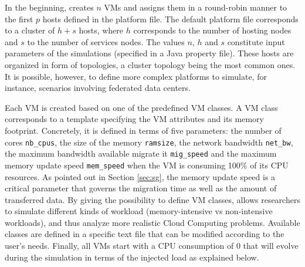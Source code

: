 In the beginning, \vmps creates $n$ VMs and assigns them in a
round-robin manner to the first $p$ hosts defined in the platform
file.  The default platform file corresponds to a cluster of $h+s$
hosts, where $h$ corresponds to the number of hosting nodes and $s$ to
the number of services nodes. The values $n$, $h$ and $s$ constitute
input parameters of the simulations (specified in a Java property
file).
These hosts are organized in form of topologies, a cluster topology
being the most common ones. It is possible, however, to define more
complex platforms to simulate, for instance, scenarios involving
federated data centers.

Each VM is created based on one of the predefined VM classes. A VM
class corresponds to a template specifying the VM attributes and its
memory footprint. Concretely, it is
defined in terms of five parameters: the number of cores
\texttt{nb\_cpus}, the size of the memory \texttt{ramsize}, the
network bandwidth \texttt{net\_bw}, the maximum bandwidth available
migrate it \texttt{mig\_speed} and the maximum memory update speed
\texttt{mem\_speed} when the VM is consuming 100\% of its CPU
resources. As pointed out in Section \ref{sec:sg}, the memory update
speed is a critical parameter that governs the migration time as well
as the amount of transferred data. By giving the possibility to define
VM classes, \vmps allows researchers to simulate different kinds of
workload (\ie memory-intensive vs non-intensive workloads), and thus
analyze more realistic Cloud Computing problems.  Available classes
are defined in a specific text file that can be modified according to
the user's needs.
%
Finally, all VMs start with a CPU consumption of 0 that will evolve
during the simulation in terms of the injected load as explained
below.


